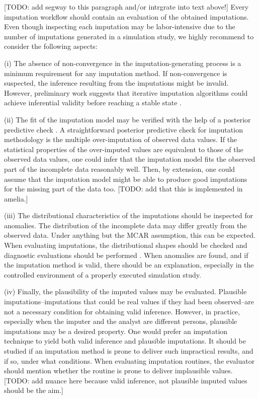 \documentclass[bimj,fleqn]{w-art}
\begin{document}
[TODO: add segway to this paragraph and/or intrgrate into text above!] Every imputation workflow should contain an evaluation of the obtained imputations. Even though inspecting each imputation may be labor-intensive due to the number of imputations generated in a simulation study, we highly recommend to consider the following aspects:

(i) The absence of non-convergence in the imputation-generating process is a minimum requirement for any imputation method. If non-convergence is suspected, the inference resulting from the imputations might be invalid. However, preliminary work suggests that iterative imputation algorithms could achieve inferential validity before reaching a stable state \citep{ober21}. 

(ii) The fit of the imputation model may be verified with the help of a posterior predictive check \citep[][]{nguy17, zhao22}. A straightforward posterior predictive check for imputation methodology is the multiple over-imputation of observed data values. If the statistical properties of the over-imputed values are equivalent to those of the observed data values, one could infer that the imputation model fits the observed part of the incomplete data reasonably well. Then, by extension, one could assume that the imputation model might be able to produce good imputations for the missing part of the data too. [TODO: add that this is implemented in amelia.]

(iii) The distributional characteristics of the imputations should be inspected for anomalies. The distribution of the incomplete data may differ greatly from the observed data. Under anything but the MCAR assumption, this can be expected. When evaluating imputations, the distributional shapes should be checked and diagnostic evaluations should be performed \citep[see][for a detailed overview of diagnostic evaluation for multivariate imputations]{abayomi2008diagnostics}. When anomalies are found, and if the imputation method is valid, there should be an explanation, especially in the controlled environment of a properly executed simulation study. 

(iv) Finally, the plausibility of the imputed values may be evaluated. Plausible imputations--imputations that could be real values if they had been observed--are not a necessary condition for obtaining valid inference. However, in practice, especially when the imputer and the analyst are different persons, plausible imputations may be a desired property. One would prefer an imputation technique to yield both valid inference and plausible imputations. It should be studied if an imputation method is prone to deliver such impractical results, and if so, under what conditions. When evaluating imputation routines, the evaluator should mention whether the routine is prone to deliver implausible values. [TODO: add nuance here because valid inference, not plausible imputed values should be the aim.]
\end{document}
